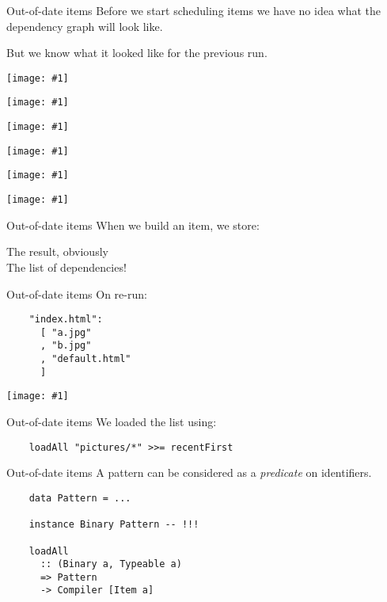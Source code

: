 \documentclass[20pt]{beamer}
\newcommand{\vspaced}{
    \vspace{5mm}
}
\newcommand{\imageframe}[1]{
    {
        \begin{frame}[plain]
        \begin{center}
        \texttt{[image: \#1]}
        \end{center}
        \end{frame}
    }
}
\begin{document}
\begin{frame}{Out-of-date items}
    Before we start scheduling items we have no idea what the dependency graph
    will look like. \\
    \vspaced
    But we know what it looked like for the previous run.
\end{frame}

\imageframe{{images/deps-01.dot}.pdf}
\imageframe{{images/deps-02.dot}.pdf}
\imageframe{{images/deps-03.dot}.pdf}
\imageframe{{images/deps-04.dot}.pdf}
\imageframe{{images/deps-05.dot}.pdf}
\imageframe{{images/deps-06.dot}.pdf}

\begin{frame}{Out-of-date items}
    When we build an item, we store: \\
    \vspaced
    The result, obviously \\
    The list of dependencies!
\end{frame}

\begin{frame}[fragile]{Out-of-date items}
    On re-run: \\
    \vspaced
    \begin{lstlisting}
    "index.html":
      [ "a.jpg"
      , "b.jpg"
      , "default.html"
      ]
    \end{lstlisting}
\end{frame}

\imageframe{{images/deps-04.dot}.pdf}

\begin{frame}[fragile]{Out-of-date items}
    We loaded the list using: \\
    \vspaced
    \begin{lstlisting}
    loadAll "pictures/*" >>= recentFirst
    \end{lstlisting}
\end{frame}

\begin{frame}[fragile]{Out-of-date items}
    A pattern can be considered as a \emph{predicate} on identifiers. \\
    \vspaced
    \begin{lstlisting}
    data Pattern = ...

    instance Binary Pattern -- !!!

    loadAll
      :: (Binary a, Typeable a)
      => Pattern
      -> Compiler [Item a]
    \end{lstlisting}
\end{frame}
\end{document}
